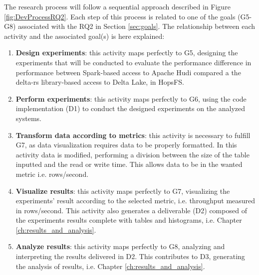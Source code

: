 The research process will follow a sequential approach described in Figure \ref{fig:DevProcessRQ2}. Each step of this process is related to one of the goals (G5-G8) associated with the RQ2 in Section \ref{sec:goals}.
The relationship between each activity and the associated goal(s) is here explained:
\begin{enumerate}
    \item \textbf{Design experiments}: this activity maps perfectly to G5, designing the experiments that will be conducted to evaluate the performance difference in performance between Spark-based access to Apache Hudi compared a the delta-rs \cite{DeltaioDeltars2024} library-based access to Delta Lake, in \gls{HopsFS}. 
    \item \textbf{Perform experiments}: this activity maps perfectly to G6, using the code implementation (D1) to conduct the designed experiments on the analyzed systems.
    \item \textbf{Transform data according to metrics}: this activity is necessary to fulfill G7, as data visualization requires data to be properly formatted. In this activity data is modified, performing a division between the size of the table inputted and the read or write time. This allows data to be in the wanted metric i.e. rows/second.
    \item \textbf{Visualize results}: this activity maps perfectly to G7, visualizing the experiments' result according to the selected metric, i.e. throughput measured in rows/second. This activity also generates a deliverable (D2) composed of the experiments results complete with tables and histograms, i.e. Chapter \ref{ch:results_and_analysis}.
    \item \textbf{Analyze results}: this activity maps perfectly to G8, analyzing and interpreting the results delivered in D2. This contributes to D3, generating the analysis of results, i.e. Chapter \ref{ch:results_and_analysis}.
\end{enumerate}
